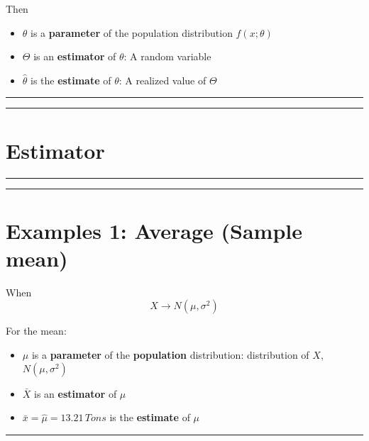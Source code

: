 \documentclass[
]{book}
\providecommand{\tightlist}{%
  \setlength{\itemsep}{0pt}\setlength{\parskip}{0pt}}
\begin{document}
Then

\begin{itemize}
\tightlist
\item
  \(\theta\) is a \textbf{parameter} of the population distribution \(f(x; \theta)\)
\item
  \(\Theta\) is an \textbf{estimator} of \(\theta\): A random variable
\item
  \(\hat{\theta}\) is the \textbf{estimate} of \(\theta\): A realized value of \(\Theta\)
\end{itemize}

\begin{center}\rule{0.5\linewidth}{0.5pt}\end{center}

\begin{center}\rule{0.5\linewidth}{0.5pt}\end{center}

\hypertarget{estimator-1}{%
\section{Estimator}\label{estimator-1}}

\begin{center}\rule{0.5\linewidth}{0.5pt}\end{center}

\begin{center}\rule{0.5\linewidth}{0.5pt}\end{center}

\hypertarget{examples-1-average-sample-mean}{%
\section{Examples 1: Average (Sample mean)}\label{examples-1-average-sample-mean}}

When \[X \rightarrow N(\mu, \sigma^2)\]

For the mean:

\begin{itemize}
\tightlist
\item
  \(\mu\) is a \textbf{parameter} of the \textbf{population} distribution: distribution of \(X\), \(N(\mu, \sigma^2)\)
\item
  \(\bar{X}\) is an \textbf{estimator} of \(\mu\)
\item
  \(\bar{x}=\hat{\mu}=13.21 \, Tons\) is the \textbf{estimate} of \(\mu\)
\end{itemize}

\begin{center}\rule{0.5\linewidth}{0.5pt}\end{center}
\end{document}
